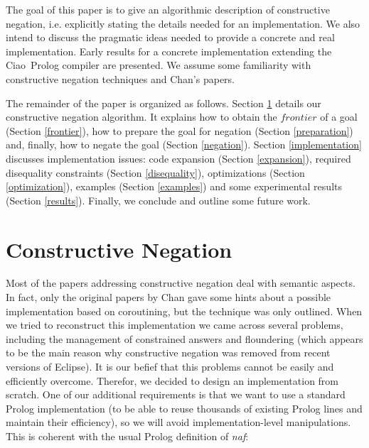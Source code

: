 \documentclass{llncs}
\newcommand{\naf}{{\em naf}}\newcommand{\viejo}[1]{}
\newcommand{\ciao}{Ciao}
\begin{document}
The goal of this paper is to give an algorithmic description of
constructive negation, i.e. explicitly stating the details needed for
an implementation. We also intend to discuss the pragmatic ideas
needed to provide a concrete and real implementation. Early results
for a concrete implementation extending the \ciao\ Prolog compiler are
presented.  We assume some familiarity with constructive negation
techniques and Chan's papers.

The remainder of the paper is organized as follows. Section
\ref{constructive} details our constructive negation algorithm. It
explains how to obtain the $frontier$ of a goal (Section
\ref{frontier}), how to prepare the goal for negation (Section
\ref{preparation}) and, finally, how to negate the goal (Section
\ref{negation}). Section \ref{implementation} discusses implementation
issues: code expansion (Section \ref{expansion}), required disequality
constraints (Section \ref{disequality}), optimizations (Section
\ref{optimization}), examples (Section \ref{examples}) and some
experimental results (Section \ref{results}).  Finally, we conclude
and outline some future work.
 


\section{Constructive Negation}
\label{constructive}

Most of the papers addressing constructive negation deal with semantic
aspects. In fact, only the original papers by Chan gave some hints
about a possible implementation based on coroutining, but the
technique was only outlined. When we tried to reconstruct this
implementation we came across several problems, including the
management of constrained answers and floundering (which appears to be
the main reason why constructive negation was removed from recent
versions of Eclipse). It is our befief that this problems cannot be
easily and efficiently overcome. Therefor, we decided to design an
implementation from scratch.  One of our additional requirements is
that we want to use a standard Prolog implementation (to be able to
reuse thousands of existing Prolog lines and maintain their
efficiency), so we will avoid implementation-level manipulations. This
is coherent with the usual Prolog definition of \naf:
\end{document}
